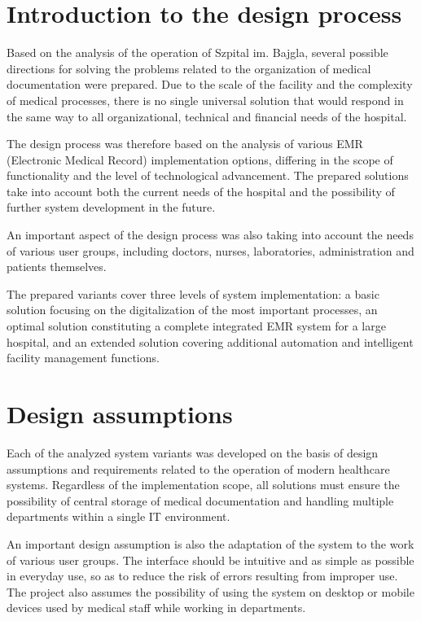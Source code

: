     \label{chapter:project-idea}

    \setlength{\parskip}{0pt}
    \setlength{\parindent}{1.25cm}

    \section{Introduction to the design process}
    Based on the analysis of the operation of Szpital im. Bajgla, several possible directions for solving the problems related to the organization of medical documentation were prepared. Due to the scale of the facility and the complexity of medical processes, there is no single universal solution that would respond in the same way to all organizational, technical and financial needs of the hospital.

    The design process was therefore based on the analysis of various EMR (Electronic Medical Record) implementation options, differing in the scope of functionality and the level of technological advancement. The prepared solutions take into account both the current needs of the hospital and the possibility of further system development in the future.

    An important aspect of the design process was also taking into account the needs of various user groups, including doctors, nurses, laboratories, administration and patients themselves.

    The prepared variants cover three levels of system implementation: a basic solution focusing on the digitalization of the most important processes, an optimal solution constituting a complete integrated EMR system for a large hospital, and an extended solution covering additional automation and intelligent facility management functions.


    \section{Design assumptions}
    Each of the analyzed system variants was developed on the basis of design assumptions and requirements related to the operation of modern healthcare systems. Regardless of the implementation scope, all solutions must ensure the possibility of central storage of medical documentation and handling multiple departments within a single IT environment.

    An important design assumption is also the adaptation of the system to the work of various user groups. The interface should be intuitive and as simple as possible in everyday use, so as to reduce the risk of errors resulting from improper use. The project also assumes the possibility of using the system on desktop or mobile devices used by medical staff while working in departments.


